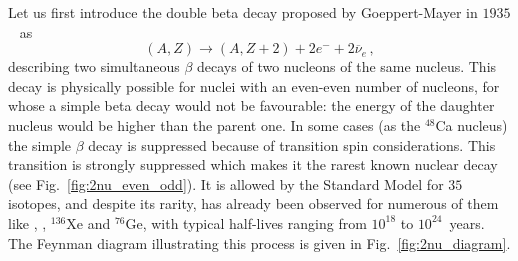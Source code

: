 Let us first introduce the double beta decay proposed by Goeppert-Mayer in $1935$~\cite{art:goeppert_1935} as
\begin{equation}
(A,Z)\rightarrow (A,Z+2)+2e^{-}+2\overline{\nu}_{e}\,,
\end{equation}
describing two simultaneous $\beta$ decays of two nucleons of the same nucleus.
This decay is physically possible for nuclei with an even-even number of nucleons, for whose a simple beta decay would not be favourable: the energy of the daughter nucleus would be higher than the parent one.
In some cases (as the $^{48}$Ca nucleus) the simple $\beta$ decay is suppressed because of transition spin considerations.
This transition is strongly suppressed which makes it the rarest known nuclear decay (see Fig.~\ref{fig:2nu_even_odd}).
It is allowed by the Standard Model for $35$ isotopes, and despite its rarity, has already been observed for numerous of them like \Mo, \Se, $^{136}$Xe and $^{76}$Ge, with typical half-lives ranging from $10^{18}$ to $10^{24}$~years.
The Feynman diagram illustrating this process is given in Fig.~\ref{fig:2nu_diagram}.

